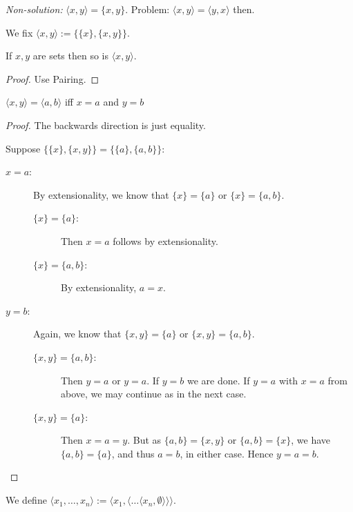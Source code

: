 \documentclass{whrartcl}
\begin{document}
\emph{Non-solution:} $\langle x, y \rangle = \{x, y\}$. Problem: $\langle x, y
\rangle = \langle y, x \rangle$ then.

\begin{definition}
  We fix $\langle x, y \rangle := \{\{x\}, \{x, y\}\}$.
\end{definition}

\begin{proposition}
  If $x, y$ are sets then so is $\langle x, y \rangle$.
\end{proposition}
\begin{proof}
  Use Pairing.
\end{proof}

\begin{theorem}
  $\langle x, y \rangle = \langle a, b \rangle$ iff $x = a$ and $y = b$
\end{theorem}
\begin{proof}
  The backwards direction is just equality.

  Suppose $\{\{x\}, \{x, y\}\} = \{\{a\}, \{a, b\}\}$:
  \begin{description}
  \item[$x = a$:] By extensionality, we know that $\{x\} = \{a\}$ or $\{x\} =
    \{a, b\}$.
    \begin{description}
    \item[$\{x\} = \{a\}$:] Then $x = a$ follows by extensionality.
    \item[$\{x\} = \{a, b\}$:] By extensionality, $a = x$.
    \end{description}
  \item[$y = b$:] Again, we know that $\{x, y\} = \{a\}$ or $\{x, y\} = \{a, b\}$.
    \begin{description}
    \item[$\{x, y\} = \{a, b\}$:] Then $y = a$ or $y = a$. If $y = b$ we are
      done. If $y = a$ with $x = a$ from above, we may continue as in the next
      case.
    \item[$\{x, y\} = \{a\}$:] Then $x = a = y$. But as $\{a, b\} = \{x, y\}$ or
      $\{a, b\} = \{x\}$, we have $\{a, b\} = \{a\}$, and thus $a = b$, in
      either case. Hence $y = a = b$.
    \end{description}
  \end{description}
\end{proof}

\begin{definition}
  We define $\langle x_1, \ldots, x_n \rangle := \langle x_1,
  \langle \ldots \langle x_n, \emptyset \rangle \rangle \rangle$.
\end{definition}
\end{document}
